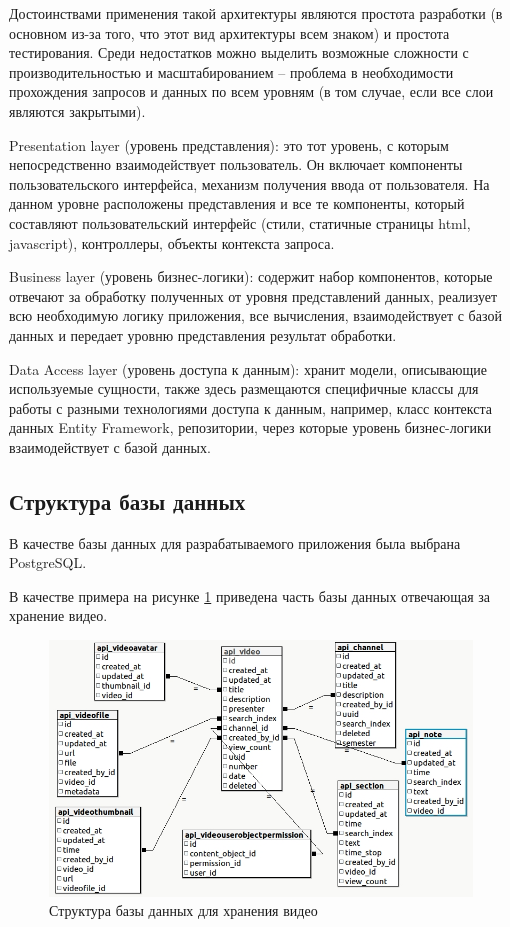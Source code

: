 Достоинствами применения такой архитектуры являются простота разработки
(в основном из-за того, что этот вид архитектуры всем знаком) и простота тестирования.
Среди недостатков можно выделить возможные сложности с производительностью и масштабированием –
проблема в необходимости прохождения запросов и данных по всем уровням
(в том случае, если все слои являются закрытыми).

Presentation layer (уровень представления): это тот уровень, с которым непосредственно
взаимодействует пользователь. Он включает компоненты пользовательского интерфейса, механизм
получения ввода от пользователя. На данном уровне расположены представления и все те компоненты,
который составляют пользовательский интерфейс (стили, статичные страницы html, javascript),
контроллеры, объекты контекста запроса.

Business layer (уровень бизнес-логики): содержит набор компонентов, которые отвечают
за обработку полученных от уровня представлений данных, реализует всю необходимую
логику приложения, все вычисления, взаимодействует с базой данных и передает уровню
представления результат обработки.

Data Access layer (уровень доступа к данным): хранит модели, описывающие используемые сущности,
также здесь размещаются специфичные классы для работы с разными технологиями доступа к данным,
например, класс контекста данных Entity Framework, репозитории, через которые уровень
бизнес-логики взаимодействует с базой данных.

\subsection{Структура базы данных}

В качестве базы данных для разрабатываемого приложения была выбрана PostgreSQL.

В качестве примера на рисунке \ref{db} приведена часть базы данных отвечающая за хранение
видео.

\begin{figure}[H]
  \centering
  \includegraphics[width=1\textwidth]{images/db.jpg}
  \caption{Структура базы данных для хранения видео\label{db}}
\end{figure}


